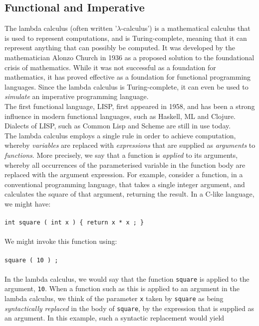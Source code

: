 \documentclass{article}
\begin{document}
\subsection{Functional and Imperative}
The lambda calculus (often written '$\lambda$-calculus') is a mathematical calculus that is used to represent computations, and is Turing-complete, meaning that it can represent anything that can possibly be computed. It was developed by the mathematician Alonzo Church in 1936 as a proposed solution to the foundational crisis of mathematics. While it was not successful as a foundation for mathematics, it has proved effective as a foundation for functional programming languages. Since the lambda calculus is Turing-complete, it can even be used to \emph{simulate} an imperative programming language.
\\\indent The first functional language, LISP, first appeared in 1958, and has been a strong influence in modern functional languages, such as Haskell, ML and Clojure. Dialects of LISP, such as Common Lisp and Scheme are still in use today.
\\
\indent The lambda calculus employs a single rule in order to achieve computation, whereby \emph{variables} are replaced with \emph{expressions} that are supplied as \emph{arguments} to \emph{functions}. More precisely, we say that a function is \emph{applied} to its arguments, whereby all occurrences of the parameterised variable in the function body are replaced with the argument expression. For example, consider a function, in a conventional programming language, that takes a single integer argument, and calculates the square of that argument, returning the result. In a C-like language, we might have:
\\\\
\indent \texttt{int square ( int x ) \{ return x * x ; \}}
\\\\
We might invoke this function using:
\\\\
\indent \texttt{square ( 10 ) ;}
\\\\
In the lambda calculus, we would say that the function \texttt{square} is applied to the argument, \texttt{10}. When a function such as this is applied to an argument in the lambda calculus, we think of the parameter \texttt{x} taken by \texttt{square} as being \emph{syntactically replaced} in the body of \texttt{square}, by the expression that is supplied as an argument. In this example, such a syntactic replacement would yield
\end{document}
